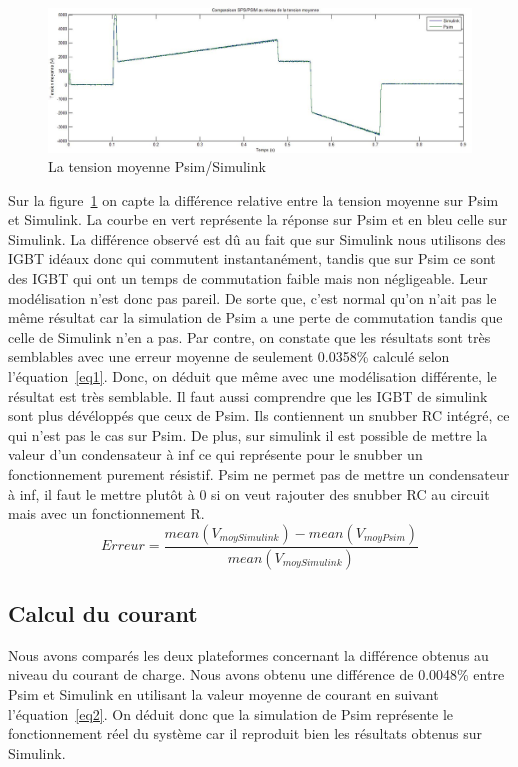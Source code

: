 \documentclass[11pt,letterpaper,final]{report}
\begin{document}
\begin{figure}[h!]
\centering
\includegraphics[scale=0.4]{fig/tmoypsim_sim.jpg}
\caption{La tension moyenne Psim/Simulink}
\label{moyt}
\end{figure}
Sur la figure~\ref{moyt} on capte la différence relative entre la tension moyenne sur Psim et Simulink. La courbe en vert représente la réponse sur Psim et en bleu celle sur Simulink. La différence observé est dû au fait que sur Simulink nous utilisons des IGBT idéaux donc qui commutent instantanément, tandis que sur Psim ce sont des IGBT qui ont un temps de commutation faible mais non négligeable. Leur modélisation n'est donc pas pareil. De sorte que, c'est normal qu'on n'ait pas le même résultat car la simulation de Psim a une perte de commutation tandis que celle de Simulink n'en a pas. Par contre, on constate que les résultats sont très semblables avec une erreur moyenne de seulement 0.0358\% calculé selon l'équation~\ref{eq1}. Donc, on déduit que même avec une modélisation différente, le résultat est très semblable. Il faut aussi comprendre que les IGBT de simulink sont plus dévéloppés que ceux de Psim. Ils contiennent un snubber RC intégré, ce qui n'est pas le cas sur Psim. De plus, sur simulink il est possible de mettre la valeur d'un condensateur à inf ce qui représente pour le snubber un fonctionnement purement résistif. Psim ne permet pas de mettre un condensateur à inf, il faut le mettre plutôt à 0 si on veut rajouter des snubber RC au circuit mais avec un fonctionnement R.
\begin{equation}
Erreur = \frac{mean(V_{moy Simulink})-mean(V_{moy Psim})}{mean(V_{moy Simulink})}
\label{eq1}
\end{equation}




\subsection{Calcul du courant}
Nous avons comparés les deux plateformes concernant la différence obtenus au niveau du courant de charge. Nous avons obtenu une différence de 0.0048\%
entre Psim et Simulink en utilisant la valeur moyenne de courant en suivant l'équation~\ref{eq2}. On déduit donc que la simulation de Psim représente le fonctionnement réel du système car il reproduit bien les résultats obtenus sur Simulink.
 
\end{document}
